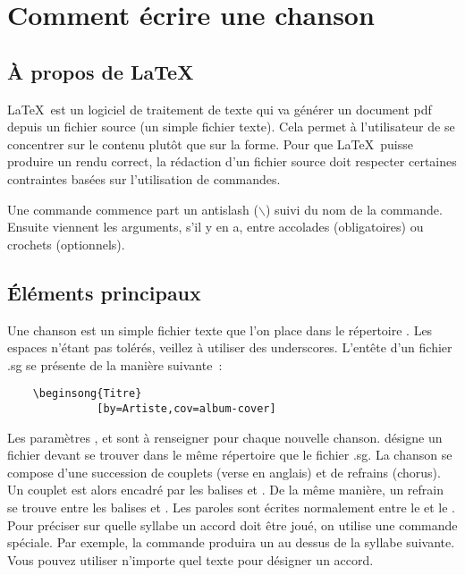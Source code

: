 \documentclass[online]{patacrep}
\begin{document}
\section{Comment écrire une chanson}

\subsection{À propos de \LaTeX\,}

\LaTeX\, est un logiciel de traitement de texte qui va générer un
document pdf depuis un fichier source (un simple fichier texte). Cela
permet à l'utilisateur de se concentrer sur le contenu plutôt que sur
la forme. Pour que \LaTeX\, puisse produire un rendu correct, la
rédaction d'un fichier source doit respecter certaines contraintes
basées sur l'utilisation de commandes.

Une commande commence part un antislash ($\backslash$) suivi du nom de
la commande. Ensuite viennent les arguments, s'il y en a, entre
accolades (obligatoires) ou crochets (optionnels).


\subsection{Éléments principaux}

Une chanson est un simple fichier texte  que l'on
place dans le répertoire . Les espaces n'étant
pas tolérés, veillez à utiliser des underscores. L'entête d'un fichier
.sg se présente de la manière suivante~:

\begin{verbatim}
    \beginsong{Titre}
              [by=Artiste,cov=album-cover]
\end{verbatim}

Les paramètres ,  et
 sont à renseigner pour chaque nouvelle
chanson.  désigne un fichier
 devant se trouver dans le même répertoire que
le fichier .sg.  La chanson se compose d'une succession de couplets
(verse en anglais) et de refrains (chorus). Un couplet est alors
encadré par les balises  et
. De la même manière, un refrain se trouve entre
les balises  et .  Les
paroles sont écrites normalement entre le  et le
. Pour préciser sur quelle syllabe un accord doit être
joué, on utilise une commande spéciale. Par exemple, la commande
\latexcom{[Mi]} produira un  au dessus de la syllabe
suivante. Vous pouvez utiliser n'importe quel texte pour désigner un
accord.
\end{document}
